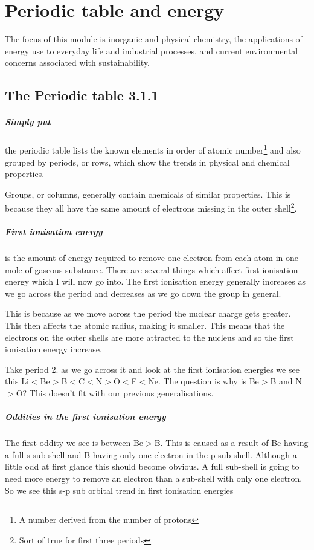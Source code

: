\chapter{Periodic table and energy}
	The focus of this module is inorganic and physical chemistry, the applications of energy use to everyday life and industrial processes, and current environmental concerns associated with sustainability. 

\section{The Periodic table 3.1.1}
	
	\paragraph{Simply put} the periodic table lists the known elements in order of atomic number\footnote{A number derived from the number of protons} and also grouped by periods, or rows, which show the trends in physical and chemical properties.
	
	Groups, or columns, generally contain chemicals of similar properties.
	This is because they all have the same amount of electrons missing in the outer shell\footnote{Sort of true for first three periods}.
	
	\paragraph{First ionisation energy} is the amount of energy required to remove one electron from each atom in one mole of gaseous substance.
	There are several things which affect first ionisation energy which I will now go into.
	The first ionisation energy generally increases as we go across the period and decreases as we go down the group in general. 
	
	This is because as we move across the period the nuclear charge gets greater.
	This then affects the atomic radius, making it smaller.
	This means that the electrons on the outer shells are more attracted to the nucleus and so the first ionisation energy increase.
	
	Take period 2.
	as we go across it and look at the first ionisation energies we see this Li$<$Be$>$B$<$C$<$N$>$O$<$F$<$Ne.
	The question is why is Be$>$B and N$>$O? This doesn't fit with our previous generalisations.
	
	\paragraph{Oddities in the first ionisation energy} The first oddity we see is between Be$>$B.
	This is caused as a result of Be having a full s sub-shell and B having only one electron in the p sub-shell.
	Although a little odd at first glance this should become obvious.
	A full sub-shell is going to need more energy to remove an electron than a sub-shell with only one electron.
	So we see this s-p sub orbital trend in first ionisation energies
	
